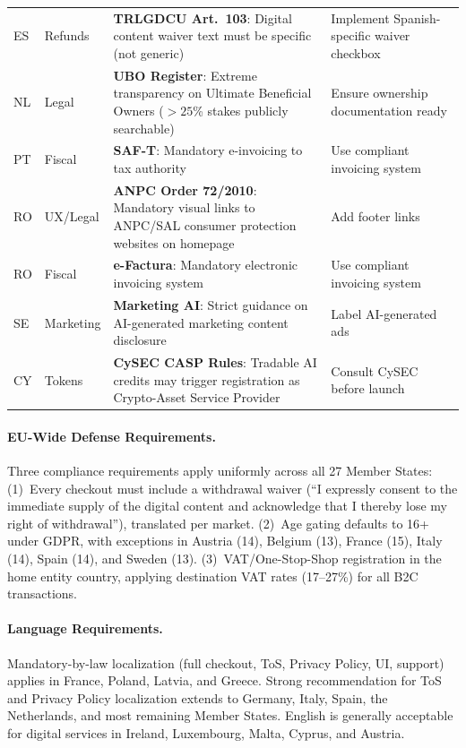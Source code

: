 \documentclass[11pt,a4paper]{article}
\begin{document}
\begin{longtable}{@{}llp{5.5cm}p{3.5cm}@{}}
ES & Refunds & \textbf{TRLGDCU Art.~103}: Digital content waiver text must be specific (not generic) & Implement Spanish-specific waiver checkbox \\
NL & Legal & \textbf{UBO Register}: Extreme transparency on Ultimate Beneficial Owners ($>25$\% stakes publicly searchable) & Ensure ownership documentation ready \\
PT & Fiscal & \textbf{SAF-T}: Mandatory e-invoicing to tax authority & Use compliant invoicing system \\
RO & UX/Legal & \textbf{ANPC Order 72/2010}: Mandatory visual links to ANPC/SAL consumer protection websites on homepage & Add footer links \\
RO & Fiscal & \textbf{e-Factura}: Mandatory electronic invoicing system & Use compliant invoicing system \\
SE & Marketing & \textbf{Marketing AI}: Strict guidance on AI-generated marketing content disclosure & Label AI-generated ads \\
CY & Tokens & \textbf{CySEC CASP Rules}: Tradable AI credits may trigger registration as Crypto-Asset Service Provider & Consult CySEC before launch \\
\end{longtable}

\paragraph{EU-Wide Defense Requirements.}
Three compliance requirements apply uniformly across all 27 Member States: (1)~Every checkout must include a withdrawal waiver (``I expressly consent to the immediate supply of the digital content and acknowledge that I thereby lose my right of withdrawal''), translated per market. (2)~Age gating defaults to 16+ under GDPR, with exceptions in Austria (14), Belgium (13), France (15), Italy (14), Spain (14), and Sweden (13). (3)~VAT/One-Stop-Shop registration in the home entity country, applying destination VAT rates (17--27\%) for all B2C transactions.

\paragraph{Language Requirements.}
Mandatory-by-law localization (full checkout, ToS, Privacy Policy, UI, support) applies in France, Poland, Latvia, and Greece. Strong recommendation for ToS and Privacy Policy localization extends to Germany, Italy, Spain, the Netherlands, and most remaining Member States. English is generally acceptable for digital services in Ireland, Luxembourg, Malta, Cyprus, and Austria.
\end{document}
